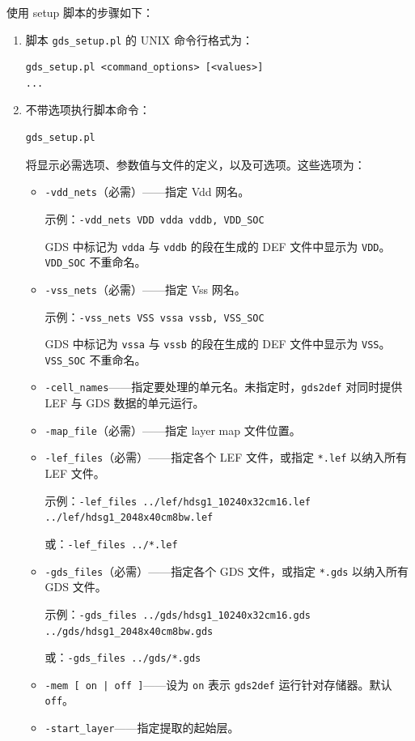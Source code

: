 使用 setup 脚本的步骤如下：

\begin{enumerate}
  \item 脚本 \texttt{gds\_setup.pl} 的 UNIX 命令行格式为：
\begin{lstlisting}
gds_setup.pl <command_options> [<values>]
...
\end{lstlisting}
  \item 不带选项执行脚本命令：
\begin{lstlisting}
gds_setup.pl
\end{lstlisting}
  将显示必需选项、参数值与文件的定义，以及可选项。这些选项为：
  \begin{itemize}
    \item \texttt{-vdd\_nets}（必需）——指定 Vdd 网名。
    
    示例：\texttt{-vdd\_nets VDD vdda vddb, VDD\_SOC}

    GDS 中标记为 \texttt{vdda} 与 \texttt{vddb} 的段在生成的 DEF 文件中显示为 \texttt{VDD}。\texttt{VDD\_SOC} 不重命名。
    \item \texttt{-vss\_nets}（必需）——指定 Vss 网名。
    
    示例：\texttt{-vss\_nets VSS vssa vssb, VSS\_SOC}

    GDS 中标记为 \texttt{vssa} 与 \texttt{vssb} 的段在生成的 DEF 文件中显示为 \texttt{VSS}。\texttt{VSS\_SOC} 不重命名。
    \item \texttt{-cell\_names}——指定要处理的单元名。未指定时，\texttt{gds2def} 对同时提供 LEF 与 GDS 数据的单元运行。
    \item \texttt{-map\_file}（必需）——指定 layer map 文件位置。
    \item \texttt{-lef\_files}（必需）——指定各个 LEF 文件，或指定 \texttt{*.lef} 以纳入所有 LEF 文件。
    
    示例：\texttt{-lef\_files ../lef/hdsg1\_10240x32cm16.lef ../lef/hdsg1\_2048x40cm8bw.lef}

    或：\texttt{-lef\_files ../*.lef}
    \item \texttt{-gds\_files}（必需）——指定各个 GDS 文件，或指定 \texttt{*.gds} 以纳入所有 GDS 文件。
    
    示例：\texttt{-gds\_files ../gds/hdsg1\_10240x32cm16.gds ../gds/hdsg1\_2048x40cm8bw.gds}

    或：\texttt{-gds\_files ../gds/*.gds}
    \item \texttt{-mem [ on | off ]}——设为 \texttt{on} 表示 \texttt{gds2def} 运行针对存储器。默认 \texttt{off}。
    \item \texttt{-start\_layer}——指定提取的起始层。
    

\end{itemize}
\end{enumerate}
